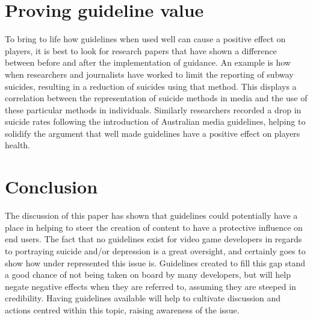 \documentclass{scrartcl}
\begin{document}
	\section{Proving guideline value}
		To bring to life how guidelines when used well can cause a positive effect on players, it is best to look for research papers that have shown a difference between before and after the implementation of guidance.
		An example is how when researchers and journalists have worked to limit the reporting of subway suicides, resulting in a reduction of suicides using that method\cite{etzersdorfer1998preventing}. This displays a correlation between the representation of suicide methods in media and the use of these particular methods in individuals.
		Similarly researchers recorded a drop in suicide rates following the introduction of Australian media guidelines\cite{niederkrotenthaler2007assessing}, helping to solidify the argument that well made guidelines have a positive effect on players health. 
		
	\section{Conclusion}
		The discussion of this paper has shown that guidelines could potentially have a place in helping to steer the creation of content to have a protective influence on end users. The fact that no guidelines exist for video game developers in regards to portraying suicide and/or depression is a great oversight, and certainly goes to show how under represented this issue is. 
		Guidelines created to fill this gap stand a good chance of not being taken on board by many developers, but will help negate negative effects when they are referred to, assuming they are steeped in credibility. Having guidelines available will help to cultivate discussion and actions centred within this topic, raising awareness of the issue.
		
		
	
	
	
\end{document}
